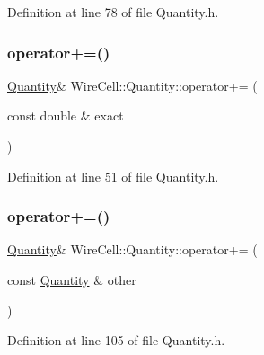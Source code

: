 Definition at line 78 of file Quantity.\+h.

\mbox{\label{class_wire_cell_1_1_quantity_a4b85966e763f3981267103c4f60bd836}} 
\subsubsection{\texorpdfstring{operator+=()}{operator+=()}\hspace{0.1cm}{\footnotesize\ttfamily [1/2]}}
{\footnotesize\ttfamily \hyperlink{class_wire_cell_1_1_quantity}{Quantity}\& Wire\+Cell\+::\+Quantity\+::operator+= (\begin{DoxyParamCaption}\item[{const double \&}]{exact }\end{DoxyParamCaption})\hspace{0.3cm}{\ttfamily [inline]}}



Definition at line 51 of file Quantity.\+h.

\mbox{\label{class_wire_cell_1_1_quantity_af74f26160ad96854498529767e9453e6}} 
\subsubsection{\texorpdfstring{operator+=()}{operator+=()}\hspace{0.1cm}{\footnotesize\ttfamily [2/2]}}
{\footnotesize\ttfamily \hyperlink{class_wire_cell_1_1_quantity}{Quantity}\& Wire\+Cell\+::\+Quantity\+::operator+= (\begin{DoxyParamCaption}\item[{const \hyperlink{class_wire_cell_1_1_quantity}{Quantity} \&}]{other }\end{DoxyParamCaption})\hspace{0.3cm}{\ttfamily [inline]}}



Definition at line 105 of file Quantity.\+h.

\mbox{\label{class_wire_cell_1_1_quantity_acd354b2f1b322acf0d338ac4f9185239}} 
